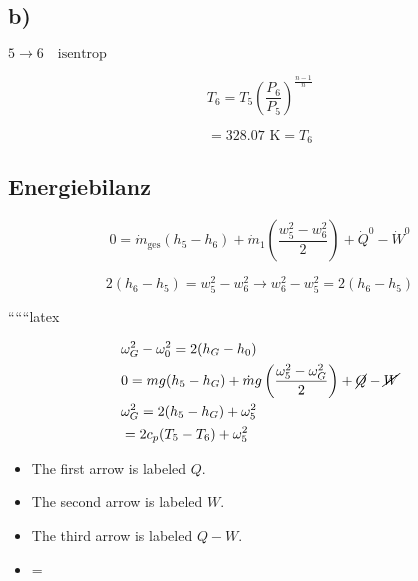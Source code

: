 

\subsection*{b)}

$5 \rightarrow 6 \quad \text{isentrop}$

\[
T_6 = T_5 \left( \frac{P_6}{P_5} \right)^{\frac{n-1}{n}}
\]

\[
= 328.07 \text{ K} = T_6
\]

\subsection*{Energiebilanz}

\[
0 = \dot{m}_{\text{ges}} (h_5 - h_6) + \dot{m}_1 \left( \frac{w_5^2 - w_6^2}{2} \right) + \dot{Q}^0 - \dot{W}^0
\]

\[
2 (h_6 - h_5) = w_5^2 - w_6^2 \rightarrow w_6^2 - w_5^2 = 2 (h_6 - h_5)
\]

``````latex

\begin{align*}
&\omega_G^2 - \omega_0^2 = 2(h_G - h_0) \\
&0 = mg(h_5 - h_G) + \dot{m}g \left( \frac{\omega_5^2 - \omega_G^2}{2} \right) + \cancel{Q} - \cancel{W} \\
&\omega_G^2 = 2(h_5 - h_G) + \omega_5^2 \\
&= 2c_p(T_5 - T_6) + \omega_5^2
\end{align*}

\begin{itemize}
    \item The first arrow is labeled $Q$.
    \item The second arrow is labeled $W$.
    \item The third arrow is labeled $Q - W$.
\end{itemize}

\begin{itemize}
    \item {} \quad {} = 
\end{itemize}